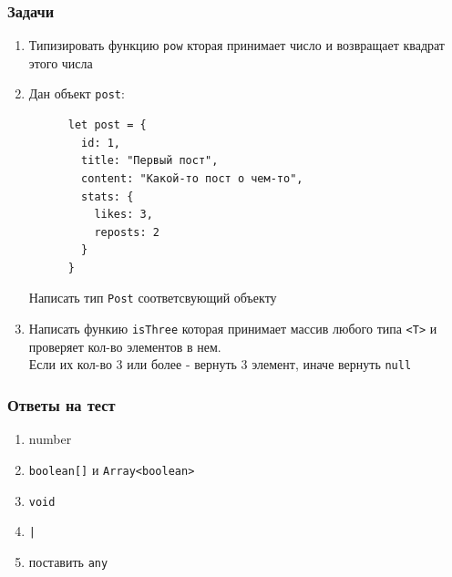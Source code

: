 \documentclass[aspectratio=169]{beamer}
\begin{document}

\begin{frame}

  \frametitle{Задачи}

  \begin{enumerate}
  \item Типизировать функцию \texttt{pow} кторая принимает число и возвращает квадрат этого числа
  \item Дан объект \texttt{post}: \\
    \begin{verbatim}
      let post = {
        id: 1,
        title: "Первый пост",
        content: "Какой-то пост о чем-то",
        stats: {
          likes: 3,
          reposts: 2
        }
      }
    \end{verbatim}
    Написать тип \texttt{Post} соответсвующий объекту

  \item Написать функию \texttt{isThree} которая принимает массив любого типа \texttt{<T>} и проверяет кол-во элементов в нем. \\
    Если их кол-во 3 или более - вернуть 3 элемент, иначе вернуть \texttt{null} 
    
  \end{enumerate}

\end{frame}


\begin{frame}

  \frametitle{Ответы на тест}
  
  \begin{enumerate}
  \item number
  \item \texttt{boolean[]} и \texttt{Array<boolean>}
  \item \texttt{void}
  \item \texttt{|}
  \item поставить \texttt{any}
  \end{enumerate}
\end{frame}

\end{document}
